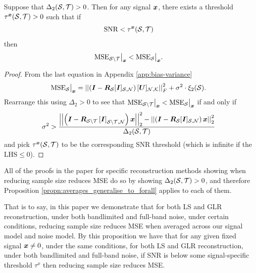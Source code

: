 \begin{propn}
    Suppose that $\Delta_{2}(\mathcal{S},\mathcal{T}) > 0$. Then for any signal $\bm{x}$, there exists a threshold $\tau^{\bm{x}}(\mathcal{S},\mathcal{T}) > 0$ such that if
    \begin{equation}
        \textrm{SNR} < \tau^{\bm{x}}(\mathcal{S},\mathcal{T})
    \end{equation}
    then
    \begin{equation}
        \textrm{MSE}_{\mathcal{S} \backslash \mathcal{T}} \big\vert_{\bm{x}} < \textrm{MSE}_{\mathcal{S}}\big\vert_{\bm{x}}.
    \end{equation}
\end{propn}
\begin{proof}
From the last equation in Appendix \ref{app:bias-variance}
\begin{equation}
\textrm{MSE}_{\set{S}}\big\vert_{\vect{x}} = \sqfrob{\left(\matr{I} - \matr{R}_{\set{S}}\matrsub[S,N]{I} \right)\matrsubU{N}} + \sigma^{2}\cdot \xi_{2}(\set{S}).
\end{equation}
   Rearrange this using $\Delta_{2} > 0$ to see that $\textrm{MSE}_{\mathcal{S} \backslash \mathcal{T}} \big\vert_{\bm{x}} < \textrm{MSE}_{\mathcal{S}}\big\vert_{\bm{x}}$ if and only if
   \begin{align}
       \sigma^{2} > \frac{{\sqnormvec{\left(\matr{I} - \matr{R}_{\set{S \backslash \set{T}}}\msubgen[\set{S}\backslash\set{T},\set{N}]{\matr{I}}\right)\vect{x}}} - {\sqnormvec{\left(\matr{I} - \matr{R}_{\set{S}}\matrsub[S,N]{I}\right)\vect{x}}}}{\Delta_{2}(\set{S},\set{T})} \label{eq:Proof_mean_to_forall_signal}
   \end{align}
   and pick $\tau^{\bm{x}}(\mathcal{S},\mathcal{T})$ to be the corresponding SNR threshold (which is infinite if the $\text{LHS} \leq 0$).
\end{proof}

All of the proofs in the paper for specific reconstruction methods showing when reducing sample size reduces MSE do so by showing $\Delta_{2}(\mathcal{S},\mathcal{T}) > 0$, and therefore Proposition \ref{propn:averages_generalise_to_forall} applies to each of them.

That is to say, in this paper we demonstrate that for both LS and GLR reconstruction, under both bandlimited and full-band noise, under certain conditions, reducing sample size reduces MSE when averaged across our signal model and noise model. By this proposition we have that for any given fixed signal $\bm{x} \neq 0$, under the same conditions, for both LS and GLR reconstruction, under both bandlimited and full-band noise, if SNR is below some signal-specific threshold $\tau^{x}$ then reducing sample size reduces MSE.

